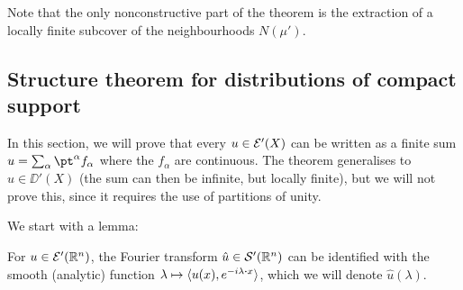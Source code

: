 Note that the only nonconstructive part of the theorem is the extraction of a locally finite subcover of the neighbourhoods $N(\mu')$. 

\subsection{Structure theorem for distributions of compact support}
In this section, we will prove that every $u \in \mathcal E'(X)$ can be written as a finite sum $u = \sum_\alpha \pt^\alpha f_\alpha$ where the $f_\alpha$ are continuous. The theorem generalises to $u \in \DD'(X)$ (the sum can then be infinite, but locally finite), but we will not prove this, since it requires the use of partitions of unity. 

We start with a lemma:
\begin{lemma}
	For $u \in \mathcal E'(\mathbb R^n)$, the Fourier transform $\hat u \in \mathcal S'(\mathbb R^n)$ can be identified with the smooth (analytic) function $\lambda \mapsto \ang{u(x), e^{-i\lambda\vdot x}}$, which we will denote $\hat u(\lambda)$. 
\end{lemma}

